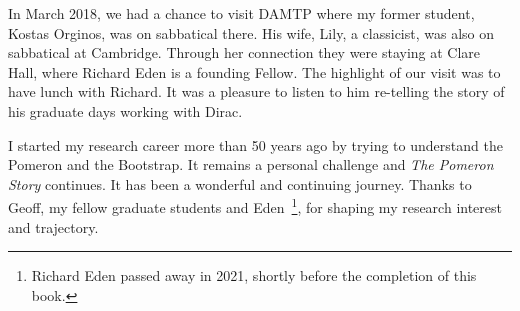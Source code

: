 \documentclass[11pt, oneside]{article}   	%
\newcommand{\<}{\langle}
\renewcommand{\>}{\rangle}
\numberwithin{equation}{section}
\numberwithin{figure}{section}
\begin{document}
\vspace{-2mm}

In March 2018, 
we had a chance to visit DAMTP where my former student, Kostas Orginos, was on sabbatical there. His wife, Lily, a classicist, was also on sabbatical at Cambridge.  Through her connection they were staying at Clare Hall, where Richard Eden  is a founding Fellow.   The highlight of our visit was to have lunch with Richard. It was a pleasure to listen to him re-telling the story of his graduate days working with Dirac.

 \font=3.25pt

I started my research career more than 50 years ago  by trying to understand the Pomeron and the Bootstrap.  It remains a personal challenge and {\it The Pomeron Story} continues.
 It has been a wonderful and continuing journey. Thanks to Geoff, my fellow graduate students and Eden~\footnote{ Richard Eden passed away in 2021, shortly before the completion of this book.}, for  shaping my research interest and trajectory.   

 \font=3.5pt
\end{document}
